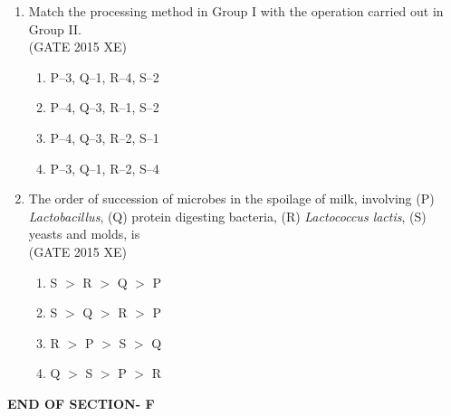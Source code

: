 \documentclass[journal,12pt,onecolumn]{IEEEtran}
\begin{document}
\begin{enumerate}
\item Match the processing method in Group I with the operation carried out in Group II.\\



\hfill{(GATE 2015 XE)} 
\begin{multicols}{2}
\begin{enumerate}
\item P–3, Q–1, R–4, S–2
\item P–4, Q–3, R–1, S–2
\item P–4, Q–3, R–2, S–1
\item P–3, Q–1, R–2, S–4
\end{enumerate}
\end{multicols}


\item The order of succession of microbes in the spoilage of milk, involving (P) \textit{Lactobacillus}, (Q) protein digesting bacteria, (R) \textit{Lactococcus lactis}, (S) yeasts and molds, is\\
\hfill{(GATE 2015 XE)} 
\begin{multicols}{4}
\begin{enumerate}
\item S $>$ R $>$ Q $>$ P
\item S $>$ Q $>$ R $>$ P
\item R $>$ P $>$ S $>$ Q
\item Q $>$ S $>$ P $>$ R
\end{enumerate}
\end{multicols}

\end{enumerate}

\bigskip
\begin{center}
    \item[\textbf{END OF SECTION- F}]
\end{center}
\end{document}
